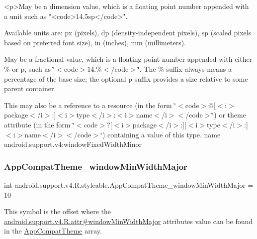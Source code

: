 \begin{DoxyVerb}      <p>May be a dimension value, which is a floating point number appended with a unit such as "<code>14.5sp</code>".
\end{DoxyVerb}
 Available units are\+: px (pixels), dp (density-\/independent pixels), sp (scaled pixels based on preferred font size), in (inches), mm (millimeters). 

May be a fractional value, which is a floating point number appended with either \% or p, such as \char`\"{}$<$code$>$14.\%$<$/code$>$\char`\"{}. The \% suffix always means a percentage of the base size; the optional p suffix provides a size relative to some parent container. 

This may also be a reference to a resource (in the form \char`\"{}$<$code$>$@\mbox{[}$<$i$>$package$<$/i$>$\+:\mbox{]}$<$i$>$type$<$/i$>$\+:$<$i$>$name$<$/i$>$$<$/code$>$\char`\"{}) or theme attribute (in the form \char`\"{}$<$code$>$?\mbox{[}$<$i$>$package$<$/i$>$\+:\mbox{]}\mbox{[}$<$i$>$type$<$/i$>$\+:\mbox{]}$<$i$>$name$<$/i$>$$<$/code$>$\char`\"{}) containing a value of this type.  name android.\+support.\+v4\+:window\+Fixed\+Width\+Minor \mbox{\label{classandroid_1_1support_1_1v4_1_1R_1_1styleable_a5645adca1e8252ffeb1dc1c1480693b1}} 
\subsubsection{\texorpdfstring{App\+Compat\+Theme\+\_\+window\+Min\+Width\+Major}{AppCompatTheme\_windowMinWidthMajor}}
{\footnotesize\ttfamily int android.\+support.\+v4.\+R.\+styleable.\+App\+Compat\+Theme\+\_\+window\+Min\+Width\+Major = 10\hspace{0.3cm}{\ttfamily [static]}}

This symbol is the offset where the \hyperlink{classandroid_1_1support_1_1v4_1_1R_1_1attr_a331daac6525b467fa201e2659110760e}{android.\+support.\+v4.\+R.\+attr\#window\+Min\+Width\+Major} attribute\textquotesingle{}s value can be found in the \hyperlink{classandroid_1_1support_1_1v4_1_1R_1_1styleable_ac07ebbe62ed977f6dcaadc6397840ace}{App\+Compat\+Theme} array.

